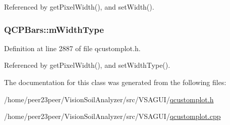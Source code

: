 Referenced by get\+Pixel\+Width(), and set\+Width().

\hypertarget{class_q_c_p_bars_a94dba1309496c7601d01e2c59715cbb3}{}
\subsubsection[{m\+Width\+Type}]{ Q\+C\+P\+Bars\+::m\+Width\+Type\hspace{0.3cm}{\ttfamily [protected]}}\label{class_q_c_p_bars_a94dba1309496c7601d01e2c59715cbb3}


Definition at line 2887 of file qcustomplot.\+h.



Referenced by get\+Pixel\+Width(), and set\+Width\+Type().



The documentation for this class was generated from the following files\+:\begin{DoxyCompactItemize}
\item 
/home/peer23peer/\+Vision\+Soil\+Analyzer/src/\+V\+S\+A\+G\+U\+I/\hyperlink{qcustomplot_8h}{qcustomplot.\+h}\item 
/home/peer23peer/\+Vision\+Soil\+Analyzer/src/\+V\+S\+A\+G\+U\+I/\hyperlink{qcustomplot_8cpp}{qcustomplot.\+cpp}\end{DoxyCompactItemize}
